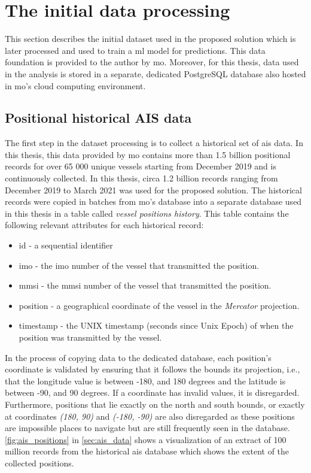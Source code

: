 \section{The initial data processing}

This section describes the initial dataset used in the proposed solution which is later processed and used to train a \acrshort{ml} model for predictions. This data foundation is provided to the author by \acrfull{mo}. Moreover, for this thesis, data used in the analysis is stored in a separate, dedicated PostgreSQL database also hosted in \acrshort{mo}'s cloud computing environment.

\subsection{Positional historical AIS data}

The first step in the dataset processing is to collect a historical set of \acrshort{ais} data. In this thesis, this data provided by \acrshort{mo} contains more than 1.5 billion positional records for over 65 000 unique vessels starting from December 2019 and is continuously collected. In this thesis, circa 1.2 billion records ranging from December 2019 to March 2021 was used for the proposed solution. The historical records were copied in batches from \acrshort{mo}'s database into a separate database used in this thesis in a table called \textit{vessel positions history}. This table contains the following relevant attributes for each historical record:

\begin{itemize}
    \item id - a sequential identifier
    \item imo - the \acrshort{imo} number of the vessel that transmitted the position.
    \item mmsi - the \acrshort{mmsi} number of the vessel that transmitted the position.
    \item position - a geographical coordinate of the vessel in the \textit{Mercator} projection.
    \item timestamp - the UNIX timestamp (seconds since Unix Epoch) of when the position was transmitted by the vessel.
\end{itemize}

In the process of copying data to the dedicated database, each position's coordinate is validated by ensuring that it follows the bounds its projection, i.e., that the longitude value is between -180, and 180 degrees and the latitude is between -90, and 90 degrees. If a coordinate has invalid values, it is disregarded. Furthermore, positions that lie exactly on the north and south bounds, or exactly at coordinates \textit{(180, 90)} and \textit{(-180, -90)} are also disregarded as these positions are impossible places to navigate but are still frequently seen in the database. \cref{fig:ais_positions} in \cref{sec:ais_data} shows a visualization of an extract of 100 million records from the historical \acrshort{ais} database which shows the extent of the collected positions.

